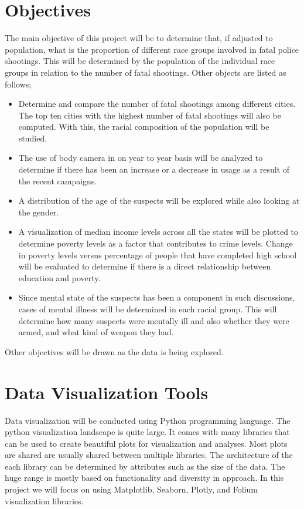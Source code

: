 \documentclass[a4paper,12pt]{article}
\begin{document}
\section{Objectives}
The main objective of this project will be to determine that, if adjusted to population, what is the proportion of different race groups involved in fatal police shootings. This will be determined by the population of the individual race groups in relation to the number of fatal shootings. Other objects are listed as follows;
\begin{itemize}
  \item Determine and compare the number of fatal shootings among different cities. The top ten cities with the highest number of fatal shootings will also be computed. With this, the racial composition of the population will be studied.
  \item The use of body camera in on year to year basis will be analyzed to determine if there has been an increase or a decrease in usage as a result of the recent campaigns.
  \item A distribution of the age of the suspects will be explored while also looking at the gender.
  \item A visualization of median income levels across all the states will be plotted to determine poverty levels as a factor that contributes to crime levels. Change in poverty levels versus percentage of people that have completed high school will be evaluated to determine if there is a direct relationship between education and poverty.
  \item Since mental state of the suspects has been a component in such discussions, cases of mental illness will be determined in each racial group. This will determine how many suspects were mentally ill and also whether they were armed, and what kind of weapon they had.
\end{itemize}
Other objectives will be drawn as the data is being explored.
\section{Data Visualization Tools}
Data visualization will be conducted using Python programming language. The python visualization landscape is quite large. It comes with many libraries that can be used to create beautiful plots for visualization and analyses. Most plots are shared are usually shared between multiple libraries. The architecture of the each library can be determined by attributes such as the size of the data\cite{python}. The huge range is mostly based on functionality and diversity in approach. In this project we will focus on using Matplotlib, Seaborn, Plotly, and Folium visualization libraries. 
\end{document}
